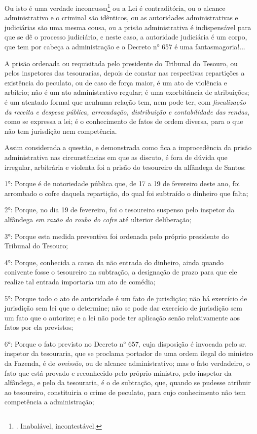 Ou isto é uma verdade inconcussa\footnote{. Inabalável, incontestável.}
ou a Lei é contraditória, ou o alcance administrativo e o criminal são
idênticos, ou as autoridades administrativas e judiciárias são uma mesma
cousa, ou a prisão administrativa é indispensável para que se dê o
processo judiciário, e neste caso, a autoridade judiciária é um corpo,
que tem por cabeça a administração e o Decreto n° 657 é uma
fantasmagoria!...

A prisão ordenada ou requisitada pelo presidente do Tribunal do Tesouro,
ou pelos inspetores das tesourarias, depois de constar nas respectivas
repartições a existência do peculato, ou de caso de força maior, é um
ato de violência e arbítrio; não é um ato administrativo regular; é uma
exorbitância de atribuições; é um atentado formal que nenhuma relação
tem, nem pode ter, com \emph{fiscalização da receita e despesa pública,
arrecadação, distribuição e contabilidade das rendas}, como se expressa
a lei; é o conhecimento de fatos de ordem diversa, para o que não tem
jurisdição nem competência.

Assim considerada a questão, e demonstrada como fica a improcedência da
prisão administrativa nas circunstâncias em que as discuto, é fora de
dúvida que irregular, arbitrária e violenta foi a prisão do tesoureiro
da alfândega de Santos:

1°: Porque é de notoriedade pública que, de 17 a 19 de fevereiro deste
ano, foi arrombado o cofre daquela repartição, do qual foi subtraído o
dinheiro que falta;

2°: Porque, no dia 19 de fevereiro, foi o tesoureiro suspenso pelo
inspetor da alfândega \emph{em razão do roubo do cofre} até ulterior
deliberação;

3°: Porque esta medida preventiva foi ordenada pelo próprio presidente
do Tribunal do Tesouro;

4°: Porque, conhecida a causa da não entrada do dinheiro, ainda quando
conivente fosse o tesoureiro na subtração, a designação de prazo para
que ele realize tal entrada importaria um ato de comédia;

5°: Porque todo o ato de autoridade é um fato de jurisdição; não há
exercício de jurisdição sem lei que o determine; não se pode dar
exercício de jurisdição sem um fato que o autorize; e a lei não pode ter
aplicação senão relativamente aos fatos por ela previstos;

6°: Porque o fato previsto no Decreto n° 657, cuja disposição é invocada
pelo sr. inspetor da tesouraria, que se proclama portador de uma ordem
ilegal do ministro da Fazenda, é de \emph{omissão}, ou de alcance
administrativo; mas o fato verdadeiro, o fato que está provado e
reconhecido pelo próprio ministro, pelo inspetor da alfândega, e pelo da
tesouraria, é o de subtração, que, quando se pudesse atribuir ao
tesoureiro, constituiria o crime de peculato, para cujo conhecimento não
tem competência a administração;

